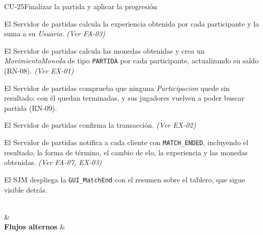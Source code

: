 \begin{fichacu}{CU-25}{Finalizar la partida y aplicar la progresión}
{\begin{cuenum}[start=9]
      \item El Servidor de partidas calcula la experiencia obtenida por cada participante y la suma a su \textit{Usuario}. \textit{(Ver \mbox{FA-03})}
      \item El Servidor de partidas calcula las monedas obtenidas y crea un \textit{MovimientoMoneda} de tipo \texttt{PARTIDA} por cada participante, actualizando su saldo (\mbox{RN-08}). \textit{(Ver \mbox{EX-01})}
      \item El Servidor de partidas comprueba que ninguna \textit{Participacion} quede sin resultado: con él quedan terminadas, y sus jugadores vuelven a poder buscar partida (\mbox{RN-09}).
      \item El Servidor de partidas confirma la transacción. \textit{(Ver \mbox{EX-02})}
      \item El Servidor de partidas notifica a cada cliente con \texttt{MATCH\_\allowbreak{}ENDED}, incluyendo el resultado, la forma de término, el cambio de elo, la experiencia y las monedas obtenidas. \textit{(Ver \mbox{FA-07}, \mbox{EX-03})}
      \item El SJM despliega la \texttt{GUI\_\allowbreak{}MatchEnd} con el resumen sobre el tablero, que sigue visible detrás.
    \end{cuenum}} \\
   &  \\ \hline
  \textbf{Flujos alternos} & 
\end{fichacu}
